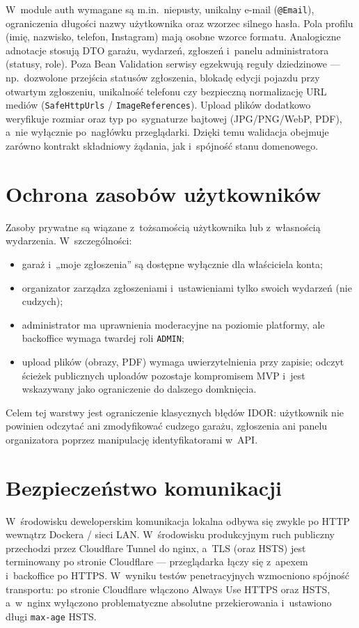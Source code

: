 \documentclass{sprz}
\begin{document}
W~module auth wymagane są m.in.\ niepusty, unikalny e-mail (\texttt{@Email}), ograniczenia długości nazwy użytkownika oraz wzorzec silnego hasła. Pola profilu (imię, nazwisko, telefon, Instagram) mają osobne wzorce formatu. Analogiczne adnotacje stosują DTO garażu, wydarzeń, zgłoszeń i~panelu administratora (statusy, role). Poza Bean Validation serwisy egzekwują reguły dziedzinowe --- np.\ dozwolone przejścia statusów zgłoszenia, blokadę edycji pojazdu przy otwartym zgłoszeniu, unikalność telefonu czy bezpieczną normalizację URL mediów (\texttt{SafeHttpUrls} / \texttt{ImageReferences}). Upload plików dodatkowo weryfikuje rozmiar oraz typ po~sygnaturze bajtowej (JPG/PNG/WebP, PDF), a~nie wyłącznie po~nagłówku przeglądarki. Dzięki temu walidacja obejmuje zarówno kontrakt składniowy żądania, jak i~spójność stanu domenowego.

\section{Ochrona zasobów użytkowników}
Zasoby prywatne są wiązane z~tożsamością użytkownika lub z~własnością wydarzenia. W~szczególności:
\begin{itemize}
  \item garaż i~„moje zgłoszenia” są dostępne wyłącznie dla właściciela konta;
  \item organizator zarządza zgłoszeniami i~ustawieniami tylko swoich wydarzeń (nie cudzych);
  \item administrator ma uprawnienia moderacyjne na poziomie platformy, ale backoffice wymaga twardej roli \texttt{ADMIN};
  \item upload plików (obrazy, PDF) wymaga uwierzytelnienia przy zapisie; odczyt ścieżek publicznych uploadów pozostaje kompromisem MVP i~jest wskazywany jako ograniczenie do dalszego domknięcia.
\end{itemize}
Celem tej warstwy jest ograniczenie klasycznych błędów IDOR: użytkownik nie powinien odczytać ani zmodyfikować cudzego garażu, zgłoszenia ani panelu organizatora poprzez manipulację identyfikatorami w~API.

\section{Bezpieczeństwo komunikacji}
W~środowisku deweloperskim komunikacja lokalna odbywa się zwykle po HTTP wewnątrz Dockera / sieci LAN. W~środowisku produkcyjnym ruch publiczny przechodzi przez Cloudflare Tunnel do nginx, a~TLS (oraz HSTS) jest terminowany po stronie Cloudflare --- przeglądarka łączy się z~apexem i~backoffice po HTTPS. W~wyniku testów penetracyjnych wzmocniono spójność transportu: po stronie Cloudflare włączono Always Use HTTPS oraz HSTS, a~w~nginx wyłączono problematyczne absolutne przekierowania i~ustawiono długi \texttt{max-age} HSTS.
\end{document}
